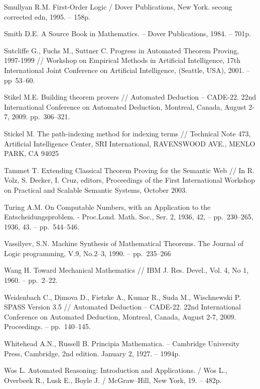 \begin{thebibliography}{99}
 Smullyan R.M. First-Order Logic / Dover Publications, New York. secong corrected edn, 1995. -- 158p.

 Smith D.E. A Source Book in Mathematics. -- Dover Publications, 1984. -- 701p.

 Sutcliffe G., Fuchs M., Suttner C. Progress in Automated Theorem Proving, 1997-1999 // Workshop on Empirical Methods in Artificial Intelligence, 17th International Joint Conference on Artificial Intelligence, (Seattle, USA), 2001. -- pp~53--60.

 Stikel M.E. Building theorem provers // Automated Deduction – CADE-22. 22nd International Conference on Automated Deduction, Montreal, Canada, August 2-7, 2009. pp.~306--321.

 Stickel M. The path-indexing method for indexing terms // Technical Note 473, Artificial Intelligence Center, SRI International, RAVENSWOOD AVE., MENLO PARK, CA 94025

 Tammet T. Extending Classical Theorem Proving for the Semantic Web // In R. Volz, S. Decker, I. Cruz, editors, Proceedings of the First International Workshop on Practical and Scalable Semantic Systems, October 2003.

 Turing A.M. On Computable Numbers, with an Application to the Entscheidungsproblem. - Proc.Lond. Math. Soc., Ser. 2, 1936, 42, -- pp.~230--265, 1936, 43. -- pp.~544--546.

 Vassilyev, S.N. Machine Synthesis of Mathematical Theorems. The Journal of Logic programming, V.9, No.2--3, 1990. -- pp.~235--266

 Wang H. Toward Mechanical Mathematics // IBM J. Res. Devel., Vol. 4, No 1, 1960. -- pp.~2--22.

 Weidenbach C., Dimova D., Fietzke A., Kumar R., Suda M., Wischnewski P. SPASS Version 3.5 // Automated Deduction – CADE-22. 22nd International Conference on Automated Deduction, Montreal, Canada, August 2-7, 2009. Proceedings. -- pp.~140--145.

 Whitehead A.N., Russell B. Principia Mathematica. -- Cambridge University Press, Cambridge, 2nd edition. January 2, 1927. -- 1994p.

 Wos L. Automated Reasoning: Introduction and Applications. / Wos L., Overbeek R., Lusk E.,  Boyle J. / McGraw--Hill,  New York, 19. -- 482p.


\end{thebibliography}

